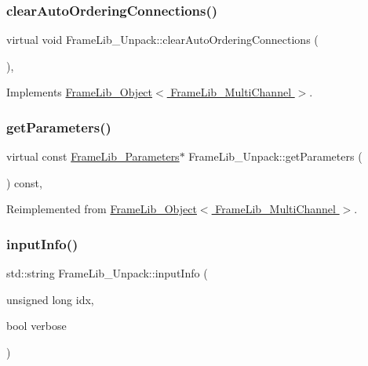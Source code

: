 \subsubsection{\texorpdfstring{clear\+Auto\+Ordering\+Connections()}{clearAutoOrderingConnections()}}
{\footnotesize\ttfamily virtual void Frame\+Lib\+\_\+\+Unpack\+::clear\+Auto\+Ordering\+Connections (\begin{DoxyParamCaption}{ }\end{DoxyParamCaption})\hspace{0.3cm}{\ttfamily [inline]}, {\ttfamily [virtual]}}



Implements \hyperlink{class_frame_lib___object_aac43ebfacb59081f7f60957380df7481}{Frame\+Lib\+\_\+\+Object$<$ Frame\+Lib\+\_\+\+Multi\+Channel $>$}.

\mbox{\label{class_frame_lib___unpack_a10013cfecf3463d8961d65042e735055}} 
\subsubsection{\texorpdfstring{get\+Parameters()}{getParameters()}}
{\footnotesize\ttfamily virtual const \hyperlink{class_frame_lib___parameters}{Frame\+Lib\+\_\+\+Parameters}$\ast$ Frame\+Lib\+\_\+\+Unpack\+::get\+Parameters (\begin{DoxyParamCaption}{ }\end{DoxyParamCaption}) const\hspace{0.3cm}{\ttfamily [inline]}, {\ttfamily [virtual]}}



Reimplemented from \hyperlink{class_frame_lib___object_ac90a6770aeef26ee1601889dc16dba56}{Frame\+Lib\+\_\+\+Object$<$ Frame\+Lib\+\_\+\+Multi\+Channel $>$}.

\mbox{\label{class_frame_lib___unpack_a1ee09b9d9ab16f598f3462d9b29533be}} 
\subsubsection{\texorpdfstring{input\+Info()}{inputInfo()}}
{\footnotesize\ttfamily std\+::string Frame\+Lib\+\_\+\+Unpack\+::input\+Info (\begin{DoxyParamCaption}\item[{unsigned long}]{idx,  }\item[{bool}]{verbose }\end{DoxyParamCaption})\hspace{0.3cm}{\ttfamily [virtual]}}



